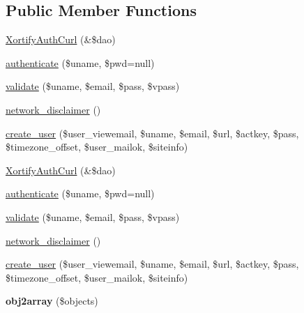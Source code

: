 \subsection*{Public Member Functions}
\begin{DoxyCompactItemize}
\item 
\hyperlink{class_xortify_auth_curl_a2430898abaead91368d79a7caa17a1b7}{Xortify\-Auth\-Curl} (\&\$dao)
\item 
\hyperlink{class_xortify_auth_curl_a00678ba307326b734e6c679f28bea315}{authenticate} (\$uname, \$pwd=null)
\item 
\hyperlink{class_xortify_auth_curl_a91121a1b702dfd20fb65a027c8ed26ec}{validate} (\$uname, \$email, \$pass, \$vpass)
\item 
\hyperlink{class_xortify_auth_curl_a1874c27b6f81a3f2ff9015405ad0f8bc}{network\-\_\-disclaimer} ()
\item 
\hyperlink{class_xortify_auth_curl_ac72efc5ad313a592cf6706876f56f7ec}{create\-\_\-user} (\$user\-\_\-viewemail, \$uname, \$email, \$url, \$actkey, \$pass, \$timezone\-\_\-offset, \$user\-\_\-mailok, \$siteinfo)
\item 
\hyperlink{class_xortify_auth_curl_a2430898abaead91368d79a7caa17a1b7}{Xortify\-Auth\-Curl} (\&\$dao)
\item 
\hyperlink{class_xortify_auth_curl_a00678ba307326b734e6c679f28bea315}{authenticate} (\$uname, \$pwd=null)
\item 
\hyperlink{class_xortify_auth_curl_a91121a1b702dfd20fb65a027c8ed26ec}{validate} (\$uname, \$email, \$pass, \$vpass)
\item 
\hyperlink{class_xortify_auth_curl_a1874c27b6f81a3f2ff9015405ad0f8bc}{network\-\_\-disclaimer} ()
\item 
\hyperlink{class_xortify_auth_curl_ac72efc5ad313a592cf6706876f56f7ec}{create\-\_\-user} (\$user\-\_\-viewemail, \$uname, \$email, \$url, \$actkey, \$pass, \$timezone\-\_\-offset, \$user\-\_\-mailok, \$siteinfo)
\item 
\hypertarget{class_xortify_auth_curl_aabc52e4f78557f0e0b360a8aaba6e11d}{{\bfseries obj2array} (\$objects)}\label{class_xortify_auth_curl_aabc52e4f78557f0e0b360a8aaba6e11d}

\end{DoxyCompactItemize}
